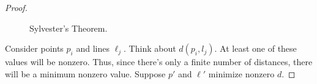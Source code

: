 \documentclass[../main.tex]{subfiles}
\begin{document}
\begin{enumerate}
\begin{proof}
\begin{figure}[h!]
            \caption{Sylvester's Theorem.}
            \label{fig:SylvestersTheorem}
        \end{figure}
        Consider points $p_i$ and lines $\ell_j$. Think about $d(p_i,l_j)$. At least one of these values will be nonzero. Thus, since there's only a finite number of distances, there will be a minimum nonzero value. Suppose $p'$ and $\ell'$ minimize nonzero $d$.
    \end{proof}
\end{enumerate}
\end{document}
